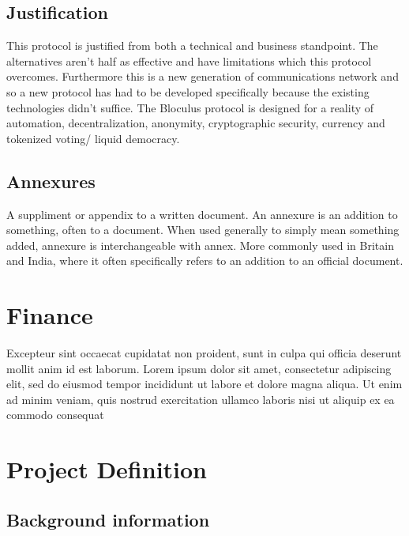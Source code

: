\documentclass[letterpaper,10pt,openany,oneside,english]{sphinxmanual}
\begin{document}
\section{Justification}
\label{\detokenize{executivesummary:justification}}
\sphinxAtStartPar
This protocol is justified from both a technical and business standpoint.
The alternatives aren’t half as effective and have limitations which this protocol overcomes.
Furthermore this is a new generation of communications network and so a new protocol has had to be developed specifically because the existing technologies didn’t suffice.
The Bloculus protocol is designed for a reality of automation, decentralization, anonymity, cryptographic security, currency and tokenized voting/ liquid democracy.


\section{Annexures}
\label{\detokenize{executivesummary:annexures}}
\sphinxAtStartPar
A suppliment or appendix to a written document. An annexure is an addition to something, often to a document.
When used generally to simply mean something added, annexure is interchangeable with annex. More commonly used in Britain and India, where it often specifically refers to an addition to an official document.


\chapter{Finance}
\label{\detokenize{finance:finance}}\label{\detokenize{finance::doc}}
\sphinxAtStartPar
Excepteur sint occaecat cupidatat non proident, sunt in culpa qui officia deserunt mollit anim id est laborum.
Lorem ipsum dolor sit amet, consectetur adipiscing elit, sed do eiusmod tempor incididunt ut labore et dolore magna aliqua. Ut enim ad minim veniam, quis nostrud exercitation ullamco laboris nisi ut aliquip ex ea commodo consequat


\chapter{Project Definition}
\label{\detokenize{projectdefinition:project-definition}}\label{\detokenize{projectdefinition::doc}}

\section{Background information}
\label{\detokenize{projectdefinition:background-information}}
\end{document}
